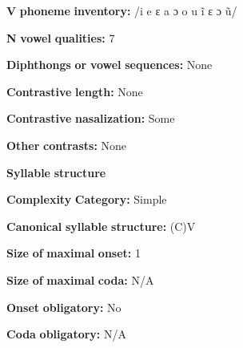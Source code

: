 \documentclass[output=paper]{langsci/langscibook}
\begin{document}
\begin{styleBody}
\textbf{V} \textbf{phoneme} \textbf{inventory:} /i e ɛ a ɔ o u ĩ ɛ ɔ ũ/
\end{styleBody}

\begin{styleBody}
\textbf{N} \textbf{vowel} \textbf{qualities:} 7
\end{styleBody}

\begin{styleBody}
\textbf{Diphthongs} \textbf{or} \textbf{vowel} \textbf{sequences:} None
\end{styleBody}

\begin{styleBody}
\textbf{Contrastive} \textbf{length:} None
\end{styleBody}

\begin{styleBody}
\textbf{Contrastive} \textbf{nasalization:} Some
\end{styleBody}

\begin{styleBody}
\textbf{Other} \textbf{contrasts:} None
\end{styleBody}

\begin{styleBody}
\textbf{Syllable} \textbf{structure}
\end{styleBody}

\begin{styleBody}
\textbf{Complexity} \textbf{Category:} Simple
\end{styleBody}

\begin{styleBody}
\textbf{Canonical} \textbf{syllable} \textbf{structure:} (C)V \citep[6]{Bamgbose1966}
\end{styleBody}

\begin{styleBody}
\textbf{Size} \textbf{of} \textbf{maximal} \textbf{onset:} 1
\end{styleBody}

\begin{styleBody}
\textbf{Size} \textbf{of} \textbf{maximal} \textbf{coda:} N/A
\end{styleBody}

\begin{styleBody}
\textbf{Onset} \textbf{obligatory:} No
\end{styleBody}

\begin{styleBody}
\textbf{Coda} \textbf{obligatory:} N/A
\end{styleBody}
\end{document}
